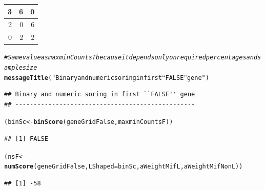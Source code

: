 \documentclass[a4paper,10pt]{article}\usepackage[]{graphicx}\usepackage[]{color}
\makeatletter
\newcommand{\hlstr}[1]{\textcolor[rgb]{0.192,0.494,0.8}{#1}}%
\newcommand{\hlcom}[1]{\textcolor[rgb]{0.678,0.584,0.686}{\textit{#1}}}%
\newcommand{\hlstd}[1]{\textcolor[rgb]{0.345,0.345,0.345}{#1}}%
\newcommand{\hlkwb}[1]{\textcolor[rgb]{0.69,0.353,0.396}{#1}}%
\newcommand{\hlkwc}[1]{\textcolor[rgb]{0.333,0.667,0.333}{#1}}%
\newcommand{\hlkwd}[1]{\textcolor[rgb]{0.737,0.353,0.396}{\textbf{#1}}}%
\newenvironment{kframe}{%
 \def\at@end@of@kframe{}%
 \ifinner\ifhmode%
  \def\at@end@of@kframe{\end{minipage}}%
  \begin{minipage}{\columnwidth}%
 \fi\fi%
 \def\FrameCommand##1{\hskip\@totalleftmargin \hskip-\fboxsep
 \colorbox{shadecolor}{##1}\hskip-\fboxsep
     \hskip-\linewidth \hskip-\@totalleftmargin \hskip\columnwidth}%
 \MakeFramed {\advance\hsize-\width
   \@totalleftmargin\z@ \linewidth\hsize
   \@setminipage}}%
 {\par\unskip\endMakeFramed%
 \at@end@of@kframe}
\newenvironment{knitrout}{}{} %
\makeatother
\begin{document}
\begin{knitrout}
\begin{tabular}{r|r|r}
\hline
3 & 6 & 0\\
\hline
2 & 0 & 6\\
\hline
0 & 2 & 2\\
\hline
\end{tabular}\begin{kframe}\begin{alltt}
\hlcom{# Same value as maxminCountsT because it depends only on required percentages and sample size}
\hlkwd{messageTitle}\hlstd{(}\hlstr{"Binary and numeric soring in first ``FALSE'' gene"}\hlstd{)}
\end{alltt}
\begin{verbatim}
## Binary and numeric soring in first ``FALSE'' gene 
## -------------------------------------------------
\end{verbatim}
\begin{alltt}
\hlstd{(binSc}\hlkwb{<-}\hlkwd{binScore} \hlstd{(geneGridFalse, maxminCountsF))}
\end{alltt}
\begin{verbatim}
## [1] FALSE
\end{verbatim}
\begin{alltt}
\hlstd{(nsF}\hlkwb{<-} \hlkwd{numScore}\hlstd{(geneGridFalse,} \hlkwc{LShaped} \hlstd{= binSc, aWeightMifL, aWeightMifNonL))}
\end{alltt}
\begin{verbatim}
## [1] -58
\end{verbatim}
\end{kframe}
\end{knitrout}
\end{document}
